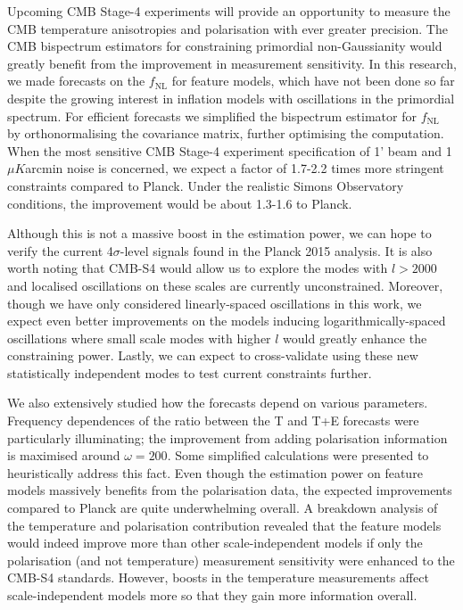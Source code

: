 Upcoming CMB Stage-4 experiments will provide an opportunity to measure the CMB temperature anisotropies and polarisation with ever greater precision. The CMB bispectrum estimators for constraining primordial non-Gaussianity would greatly benefit from the improvement in measurement sensitivity. In this research, we made forecasts on the $f_\text{NL}$ for feature models, which have not been done so far despite the growing interest in inflation models with oscillations in the primordial spectrum. For efficient forecasts we simplified the bispectrum estimator for $f_\text{NL}$ by orthonormalising the covariance matrix, further optimising the computation. When the most sensitive CMB Stage-4 experiment specification of 1' beam and 1$\mu K$arcmin noise is concerned, we expect a factor of 1.7-2.2 times more stringent constraints compared to Planck. Under the realistic Simons Observatory conditions, the improvement would be about 1.3-1.6 to Planck.

Although this is not a massive boost in the estimation power, we can hope to verify the current 4$\sigma$-level signals found in the Planck 2015 analysis. It is also worth noting that CMB-S4 would allow us to explore the modes with $l>2000$ and localised oscillations on these scales are currently unconstrained. Moreover, though we have only considered linearly-spaced oscillations in this work, we expect even better improvements on the models inducing logarithmically-spaced oscillations where small scale modes with higher $l$ would greatly enhance the constraining power. Lastly, we can expect to cross-validate using these new statistically independent modes to test current constraints further.

We also extensively studied how the forecasts depend on various parameters. Frequency dependences of the ratio between the T and T+E forecasts were particularly illuminating; the improvement from adding polarisation information is maximised around $\omega = 200$. Some simplified calculations were presented to heuristically address this fact. Even though the estimation power on feature models massively benefits from the polarisation data, the expected improvements compared to Planck are quite underwhelming overall. A breakdown analysis of the temperature and polarisation contribution revealed that the feature models would indeed improve more than other scale-independent models if only the polarisation (and not temperature) measurement sensitivity were enhanced to the CMB-S4 standards. However, boosts in the temperature measurements affect scale-independent models more so that they gain more information overall.

